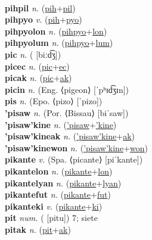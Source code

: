  \label{pihpatolon} \\
\textbf{pihpil} \textit{n.} (\hyperref[pih]{pih}+\hyperref[pil]{pil})
 \label{pihpil} \\
\textbf{pihpyo} \textit{v.} (\hyperref[pih]{pih}+\hyperref[pyo]{pyo})
 \label{pihpyo} \\
\textbf{pihpyolon} \textit{n.} (\hyperref[pihpyo]{pihpyo}+\hyperref[lon]{lon})
 \label{pihpyolon} \\
\textbf{pihpyolum} \textit{n.} (\hyperref[pihpyo]{pihpyo}+\hyperref[lum]{lum})
 \label{pihpyolum} \\
\textbf{pic} \textit{n.} ( [biːd͡ʒ])
 \label{pic} \\
\textbf{picec} \textit{n.} (\hyperref[pic]{pic}+\hyperref[ec]{ec})
 \label{picec} \\
\textbf{picak} \textit{n.} (\hyperref[pic]{pic}+\hyperref[ak]{ak})
 \label{picak} \\
\textbf{picin} \textit{n.} (Eng. ⟨pigeon⟩ [ˈpʰɪd͡ʒɪn])
 \label{picin} \\
\textbf{pis} \textit{n.} (Epo. ⟨pizo⟩ [ˈpizo])
 \label{pis} \\
\textbf{'pisaw} \textit{n.} (Por. ⟨Bissau⟩ [biˈsaw])
 \label{'pisaw} \\
\textbf{'pisaw'kine} \textit{n.} (\hyperref['pisaw]{'pisaw}+\hyperref['kine]{'kine})
 \label{'pisaw'kine} \\
\textbf{'pisaw'kineak} \textit{n.} (\hyperref['pisaw'kine]{'pisaw'kine}+\hyperref[ak]{ak})
 \label{'pisaw'kineak} \\
\textbf{'pisaw'kinewon} \textit{n.} (\hyperref['pisaw'kine]{'pisaw'kine}+\hyperref[won]{won})
 \label{'pisaw'kinewon} \\
\textbf{pikante} \textit{v.} (Spa. ⟨picante⟩ [piˈkante])
 \label{pikante} \\
\textbf{pikantelon} \textit{n.} (\hyperref[pikante]{pikante}+\hyperref[lon]{lon})
 \label{pikantelon} \\
\textbf{pikantelyan} \textit{n.} (\hyperref[pikante]{pikante}+\hyperref[lyan]{lyan})
 \label{pikantelyan} \\
\textbf{pikantefut} \textit{n.} (\hyperref[pikante]{pikante}+\hyperref[fut]{fut})
 \label{pikantefut} \\
\textbf{pikanteki} \textit{v.} (\hyperref[pikante]{pikante}+\hyperref[ki]{ki})
 \label{pikanteki} \\
\textbf{pit} \textit{num.} ( [pitu])
7; siete \label{pit} \\
\textbf{pitak} \textit{n.} (\hyperref[pit]{pit}+\hyperref[ak]{ak})
